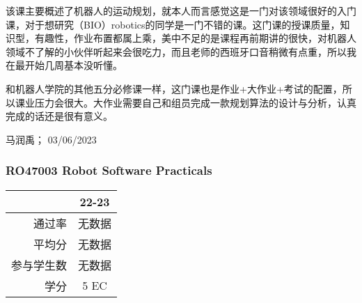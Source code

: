 该课主要概述了机器人的运动规划，就本人而言感觉这是一门对该领域很好的入门课，对于想研究（BIO）robotics的同学是一门不错的课。这门课的授课质量，知识型，有趣性，作业布置都属上乘，美中不足的是课程再前期讲的很快，对机器人领域不了解的小伙伴听起来会很吃力，而且老师的西班牙口音稍微有点重，所以我在最开始几周基本没听懂。

和机器人学院的其他五分必修课一样，这门课也是作业+大作业+考试的配置，所以课业压力会很大。大作业需要自己和组员完成一款规划算法的设计与分析，认真完成的话还是很有意义。

\begin{flushright}
马润禹； 03/06/2023
\end{flushright}

\subsubsection{RO47003 Robot Software Practicals}
\begin{minipage}{0.45\textwidth}
\centering
{}
\end{minipage}%
\begin{minipage}{0.45\textwidth}
\raggedleft
\begin{tabular}{r|c}
\textbf{ } & \textbf{22-23} \\ \hline
通过率 & 无数据 \\ 
平均分 & 无数据 \\ 
参与学生数 & 无数据 \\
学分 & 5 EC\\
\end{tabular}
\end{minipage}\\


